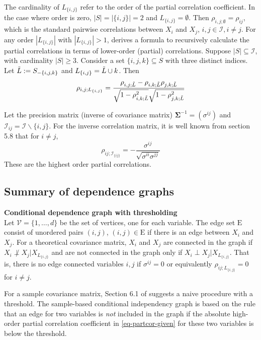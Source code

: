 \documentclass[a4paper]{article}
\def\v{\mathcal{V}}
\def\e{{\mathrm{E}}}
\def\ii {{\mathcal{I}}}
\def\lij {L_{\{i,j\}}}
\def\tildel{\Tilde{L}}
\def\sigb{{\boldsymbol{\Sigma}}}
\begin{document}
The cardinality  of  $\lij$ refer to the order of the partial correlation coefficient. In the case where order is zero, $|S|=|\{i,j\}|=2$ and $\lij=\emptyset$. Then $\rho_{i,j;\emptyset}=\rho_{ij}$, which is the standard pairwise correlations between $X_{i}$ and $X_{j}$, $i,j\in \ii, i\neq j$. For any order $|\lij|$ with $|\lij|>1$, \cite{anderson1958introduction} derives a formula to recursively calculate the partial correlations in terms of lower-order (partial) correlations.
Suppose $|S|\subseteq \ii$, with cardinality $|S|\geq 3$. Consider a set $\{i,j,k\}\subseteq S$ with three distinct indices. Let $\tildel:=S_{-\{i,j,k\}}$ and $\lij=\tildel \cup k$. Then 
\begin{equation}
\label{partial-correlations}
\rho_{i,j;\lij}=\frac{\rho_{i,j;\tildel}-\rho_{i,k;
\tildel }\rho_{j,k;\tildel}}{\sqrt{1-\rho_{i,k;\tildel}^2}
\sqrt{1-\rho_{j,k;\tildel}^2}}
\end{equation}

Let the precision matrix (inverse of covariance matrix) $\sigb^{-1}=(\sigma^{ij})$ and $\ii_{ij}=\ii \backslash\{i,j\}$. 
For the inverse correlation matrix, it is well known from \cite{Whittaker1990} section 5.8 that for $i\neq j$,
\begin{equation}
\label{eq-partcor-given}
    \rho_{ij;\ii_{\{ij\}}}=-\frac{\sigma^{ij}}{\sqrt{\sigma^{ii}\sigma^{jj}}}
\end{equation}
These are the highest order partial correlations.

\subsection{Summary of dependence graphs}
\label{dependence-graphs}


\noindent\textbf{Conditional dependence graph with thresholding}\\
Let $\v=\{1,\ldots,d\}$ be the set of vertices, one for each variable.
The edge set $\e$ consist of unordered pairs $(i,j)$, $(i,j)\in \e$ if
there is an edge between $X_i$ and $X_j$.  For a theoretical
covariance matrix, $X_i$ and $X_{j}$ are connected in the graph if
$X_{i}\not\perp X_{j}\big\vert X_{\lij}$ and are not connected in the
graph only if $X_{i}\perp X_{j}\big\vert X_{\lij}$. That is, there is
no edge connected variables $i,j$ if $\sigma^{ij}=0$ or equivalently
$\rho_{ij;\lij}=0$ for $i\neq j$.

For a sample covariance matrix, Section 6.1 of \cite{Whittaker1990}
suggests a naive procedure with a threshold.  The sample-based
conditional independency graph is based on the rule that an edge for
two variables is \textit{not} included in the graph if the absolute
high-order partial correlation coefficient in
\eqref{eq-partcor-given} for these two variables is below the
threshold.
\end{document}
